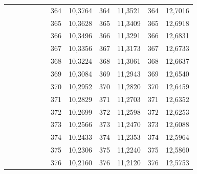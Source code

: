 \documentclass[a4paper,12pt]{article} %
\begin{document}
\begin{longtable}[c]{cccccccccc|c|c|}
	&  &  &  &  & \multicolumn{1}{c|}{} & \multicolumn{1}{c|}{364} & \multicolumn{1}{c|}{10,3764} & \multicolumn{1}{c|}{364} & 11,3521 & 364 & 12,7016 \\ \cline{7-12} 
	&  &  &  &  & \multicolumn{1}{c|}{} & \multicolumn{1}{c|}{365} & \multicolumn{1}{c|}{10,3628} & \multicolumn{1}{c|}{365} & 11,3409 & 365 & 12,6918 \\ \cline{7-12} 
	&  &  &  &  & \multicolumn{1}{c|}{} & \multicolumn{1}{c|}{366} & \multicolumn{1}{c|}{10,3496} & \multicolumn{1}{c|}{366} & 11,3291 & 366 & 12,6831 \\ \cline{7-12} 
	&  &  &  &  & \multicolumn{1}{c|}{} & \multicolumn{1}{c|}{367} & \multicolumn{1}{c|}{10,3356} & \multicolumn{1}{c|}{367} & 11,3173 & 367 & 12,6733 \\ \cline{7-12} 
	&  &  &  &  & \multicolumn{1}{c|}{} & \multicolumn{1}{c|}{368} & \multicolumn{1}{c|}{10,3224} & \multicolumn{1}{c|}{368} & 11,3061 & 368 & 12,6637 \\ \cline{7-12} 
	&  &  &  &  & \multicolumn{1}{c|}{} & \multicolumn{1}{c|}{369} & \multicolumn{1}{c|}{10,3084} & \multicolumn{1}{c|}{369} & 11,2943 & 369 & 12,6540 \\ \cline{7-12} 
	&  &  &  &  & \multicolumn{1}{c|}{} & \multicolumn{1}{c|}{370} & \multicolumn{1}{c|}{10,2952} & \multicolumn{1}{c|}{370} & 11,2820 & 370 & 12,6459 \\ \cline{7-12} 
	&  &  &  &  & \multicolumn{1}{c|}{} & \multicolumn{1}{c|}{371} & \multicolumn{1}{c|}{10,2829} & \multicolumn{1}{c|}{371} & 11,2703 & 371 & 12,6352 \\ \cline{7-12} 
	&  &  &  &  & \multicolumn{1}{c|}{} & \multicolumn{1}{c|}{372} & \multicolumn{1}{c|}{10,2699} & \multicolumn{1}{c|}{372} & 11,2598 & 372 & 12,6253 \\ \cline{7-12} 
	&  &  &  &  & \multicolumn{1}{c|}{} & \multicolumn{1}{c|}{373} & \multicolumn{1}{c|}{10,2566} & \multicolumn{1}{c|}{373} & 11,2470 & 373 & 12,6088 \\ \cline{7-12} 
	&  &  &  &  & \multicolumn{1}{c|}{} & \multicolumn{1}{c|}{374} & \multicolumn{1}{c|}{10,2433} & \multicolumn{1}{c|}{374} & 11,2353 & 374 & 12,5964 \\ \cline{7-12} 
	&  &  &  &  & \multicolumn{1}{c|}{} & \multicolumn{1}{c|}{375} & \multicolumn{1}{c|}{10,2306} & \multicolumn{1}{c|}{375} & 11,2240 & 375 & 12,5860 \\ \cline{7-12} 
	&  &  &  &  & \multicolumn{1}{c|}{} & \multicolumn{1}{c|}{376} & \multicolumn{1}{c|}{10,2160} & \multicolumn{1}{c|}{376} & 11,2120 & 376 & 12,5753 \\ \cline{7-12} 

\end{longtable}
\end{document}
